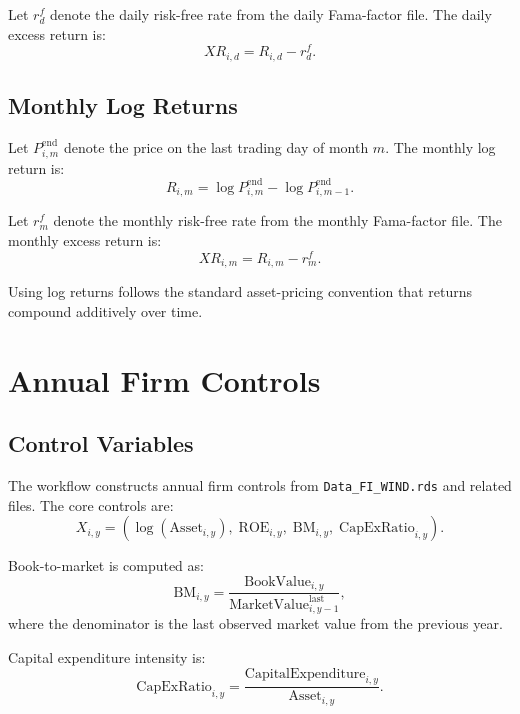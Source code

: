 \documentclass[11pt]{article}
\begin{document}
Let \(r^f_d\) denote the daily risk-free rate from the daily Fama-factor file.
The daily excess return is:
\begin{equation}
XR_{i,d}
=
R_{i,d} - r^f_d.
\end{equation}

\subsection{Monthly Log Returns}

Let \(P_{i,m}^{\mathrm{end}}\) denote the price on the last trading day of month
\(m\). The monthly log return is:
\begin{equation}
R_{i,m}
=
\log P_{i,m}^{\mathrm{end}}
-
\log P_{i,m-1}^{\mathrm{end}}.
\end{equation}

Let \(r^f_m\) denote the monthly risk-free rate from the monthly Fama-factor
file. The monthly excess return is:
\begin{equation}
XR_{i,m}
=
R_{i,m} - r^f_m.
\end{equation}

Using log returns follows the standard asset-pricing convention that returns
compound additively over time.

\section{Annual Firm Controls}

\subsection{Control Variables}

The workflow constructs annual firm controls from \texttt{Data\_FI\_WIND.rds}
and related files. The core controls are:
\[
X_{i,y}
=
\left(
\log(\mathrm{Asset}_{i,y}),\;
\mathrm{ROE}_{i,y},\;
\mathrm{BM}_{i,y},\;
\mathrm{CapExRatio}_{i,y}
\right).
\]

Book-to-market is computed as:
\begin{equation}
\mathrm{BM}_{i,y}
=
\frac{\mathrm{BookValue}_{i,y}}
{\mathrm{MarketValue}_{i,y-1}^{\mathrm{last}}},
\end{equation}
where the denominator is the last observed market value from the previous year.

Capital expenditure intensity is:
\begin{equation}
\mathrm{CapExRatio}_{i,y}
=
\frac{\mathrm{CapitalExpenditure}_{i,y}}
{\mathrm{Asset}_{i,y}}.
\end{equation}
\end{document}

